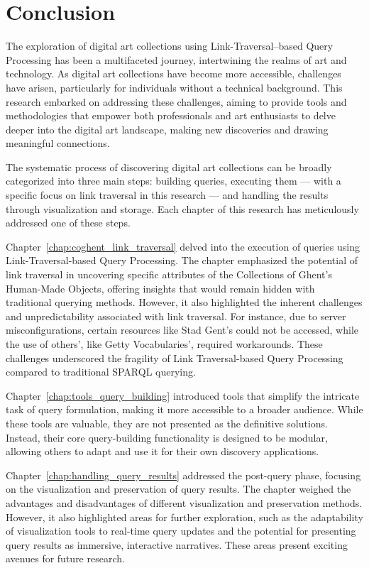\chapter*{Conclusion}

The exploration of digital art collections using Link-Traversal–based Query Processing has been a multifaceted journey, intertwining the realms of art and technology. As digital art collections have become more accessible, challenges have arisen, particularly for individuals without a technical background. This research embarked on addressing these challenges, aiming to provide tools and methodologies that empower both professionals and art enthusiasts to delve deeper into the digital art landscape, making new discoveries and drawing meaningful connections.

The systematic process of discovering digital art collections can be broadly categorized into three main steps: building queries, executing them — with a specific focus on link traversal in this research — and handling the results through visualization and storage. Each chapter of this research has meticulously addressed one of these steps.

Chapter~\ref{chap:coghent_link_traversal} delved into the execution of queries using Link-Traversal-based Query Processing. The chapter emphasized the potential of link traversal in uncovering specific attributes of the Collections of Ghent's Human-Made Objects, offering insights that would remain hidden with traditional querying methods. However, it also highlighted the inherent challenges and unpredictability associated with link traversal. For instance, due to server misconfigurations, certain resources like Stad Gent's could not be accessed, while the use of others', like Getty Vocabularies', required workarounds. These challenges underscored the fragility of Link Traversal-based Query Processing compared to traditional SPARQL querying.

Chapter~\ref{chap:tools_query_building} introduced tools that simplify the intricate task of query formulation, making it more accessible to a broader audience. While these tools are valuable, they are not presented as the definitive solutions. Instead, their core query-building functionality is designed to be modular, allowing others to adapt and use it for their own discovery applications.

Chapter~\ref{chap:handling_query_results} addressed the post-query phase, focusing on the visualization and preservation of query results. The chapter weighed the advantages and disadvantages of different visualization and preservation methods. However, it also highlighted areas for further exploration, such as the adaptability of visualization tools to real-time query updates and the potential for presenting query results as immersive, interactive narratives. These areas present exciting avenues for future research.

